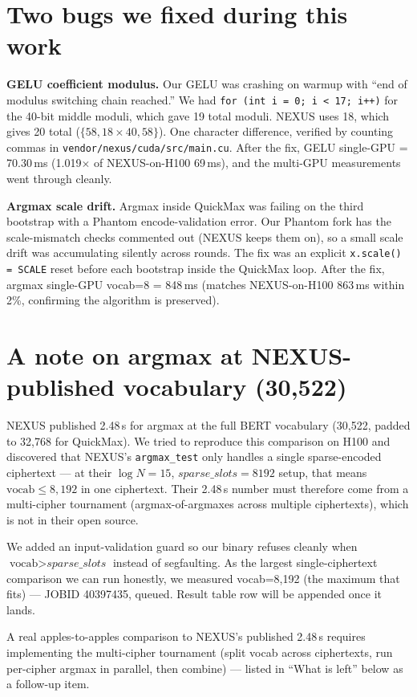 \documentclass[11pt,a4paper]{article}
\begin{document}
\section*{Two bugs we fixed during this work}

\textbf{GELU coefficient modulus.} Our GELU was crashing on warmup with ``end of modulus switching chain reached.'' We had \texttt{for (int i = 0; i < 17; i++)} for the 40-bit middle moduli, which gave 19 total moduli. NEXUS uses 18, which gives 20 total ($\{58, 18\times 40, 58\}$). One character difference, verified by counting commas in \texttt{vendor/nexus/cuda/src/main.cu}. After the fix, GELU single-GPU = 70.30\,ms (1.019$\times$ of NEXUS-on-H100 69\,ms), and the multi-GPU measurements went through cleanly.

\textbf{Argmax scale drift.} Argmax inside QuickMax was failing on the third bootstrap with a Phantom encode-validation error. Our Phantom fork has the scale-mismatch checks commented out (NEXUS keeps them on), so a small scale drift was accumulating silently across rounds. The fix was an explicit \texttt{x.scale() = SCALE} reset before each bootstrap inside the QuickMax loop. After the fix, argmax single-GPU vocab=8 = 848\,ms (matches NEXUS-on-H100 863\,ms within 2\%, confirming the algorithm is preserved).

\section*{A note on argmax at NEXUS-published vocabulary (30{,}522)}

NEXUS published 2.48\,s for argmax at the full BERT vocabulary (30{,}522, padded to 32{,}768 for QuickMax). We tried to reproduce this comparison on H100 and discovered that NEXUS's \texttt{argmax\_test} only handles a single sparse-encoded ciphertext --- at their $\log N=15$, $\textit{sparse\_slots}=8192$ setup, that means $\text{vocab} \le 8{,}192$ in one ciphertext. Their 2.48\,s number must therefore come from a multi-cipher tournament (argmax-of-argmaxes across multiple ciphertexts), which is not in their open source.

We added an input-validation guard so our binary refuses cleanly when $\text{vocab} > \textit{sparse\_slots}$ instead of segfaulting. As the largest single-ciphertext comparison we can run honestly, we measured vocab=8{,}192 (the maximum that fits) --- JOBID 40397435, queued. Result table row will be appended once it lands.

A real apples-to-apples comparison to NEXUS's published 2.48\,s requires implementing the multi-cipher tournament (split vocab across ciphertexts, run per-cipher argmax in parallel, then combine) --- listed in ``What is left'' below as a follow-up item.
\end{document}

